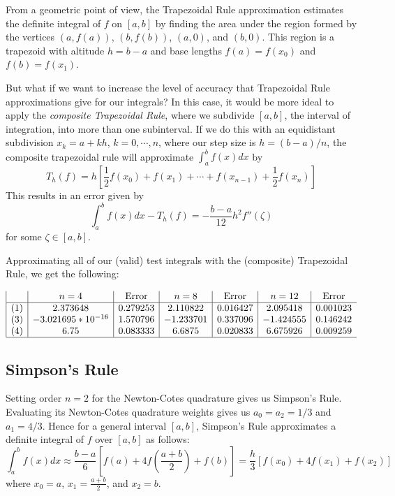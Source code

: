 \documentclass[a4paper,draft]{amsproc}
\theoremstyle{plain}
\theoremstyle{definition}
\theoremstyle{remark}
\numberwithin{equation}{section}
\begin{document}
From a geometric point of view, the Trapezoidal Rule approximation estimates the definite integral of $f$ on $[a, b]$ by finding the area under the region formed by the vertices $(a, f(a))$, $(b, f(b))$, $(a, 0)$, and $(b, 0)$. This region is a trapezoid with altitude $h=b-a$ and base lengths $f(a)=f(x_0)$ and $f(b)=f(x_1)$.

But what if we want to increase the level of accuracy that Trapezoidal Rule approximations give for our integrals? In this case, it would be more ideal to apply the \emph{composite Trapezoidal Rule}, where we subdivide $[a, b]$, the interval of integration, into more than one subinterval. If we do this with an equidistant subdivision $x_k=a+kh$, $k=0, \cdots, n$, where our step size is $h=(b-a)/n$, the composite trapezoidal rule will approximate $\displaystyle\int_{a}^{b}f(x)dx$ by
\[
T_h(f)=h\left[\displaystyle\frac{1}{2}f(x_0)+f(x_1)+\cdots+f(x_{n-1})+\frac{1}{2}f(x_n)\right]
\]
This results in an error given by
\[
\displaystyle\int_{a}^{b}f(x)dx-T_h(f)=-\frac{b-a}{12}h^2f''(\zeta)
\]
for some $\zeta\in [a, b]$.

Approximating all of our (valid) test integrals with the (composite) Trapezoidal Rule, we get the following:

\begin{displaymath}
\begin{array}{|c|c|c|c|c|c|c}

 & n=4
 & \text{Error}
 & n=8
 & \text{Error}
 & n=12
 & \text{Error} \\
\hline
(1) & 2.373648 & 0.279253 & 2.110822 & 0.016427 & 2.095418 & 0.001023 \\
(3) & -3.021695*10^{-16} & 1.570796 & -1.233701 & 0.337096 & -1.424555 & 0.146242 \\
(4) & 6.75 & 0.083333 & 6.6875 & 0.020833 & 6.675926 & 0.009259 \\
\hline
\end{array}
\end{displaymath}

\subsection{Simpson's Rule}

Setting order $n=2$ for the Newton-Cotes quadrature gives us Simpson's Rule. Evaluating its Newton-Cotes quadrature weights gives us $a_0=a_2=1/3$ and $a_1=4/3$. Hence for a general interval $[a, b]$, Simpson's Rule approximates a definite integral of $f$ over $[a, b]$ as follows:
\[
\displaystyle\int_{a}^{b}f(x)dx\approx\frac{b-a}{6}\left[f(a)+4f\left(\frac{a+b}{2}\right)+f(b)\right]=\frac{h}{3}[f(x_0)+4f(x_1)+f(x_2)]
\]
where $x_0=a$, $x_1=\displaystyle\frac{a+b}{2}$, and $x_2=b$.
\end{document}
